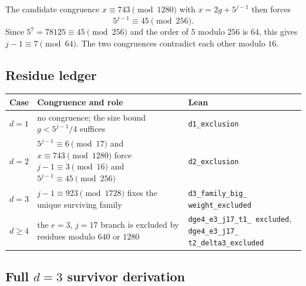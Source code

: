 The candidate congruence $x\equiv743\pmod{1280}$ with
$x=2g+5^{j-1}$ then forces
\begin{equation*}
  5^{j-1}\equiv45\pmod{256}.
\end{equation*}
Since $5^7=78125\equiv45\pmod{256}$ and the order of $5$ modulo $256$
is $64$, this gives $j-1\equiv7\pmod{64}$.  The two congruences
contradict each other modulo $16$.

\subsection{Residue ledger}

\begin{center}
\small
\begin{tabular}{@{}p{}p{}p{}@{}}
\toprule
Case & Congruence and role & Lean \\
\midrule
$d=1$ & no congruence; the size bound $g<5^{j-1}/4$ suffices &
  \texttt{d1\_\allowbreak exclusion} \\
$d=2$ & $5^{j-1}\equiv6\pmod{17}$ and $x\equiv743\pmod{1280}$ force
  $j-1\equiv3\pmod{16}$ and $5^{j-1}\equiv45\pmod{256}$ &
  \texttt{d2\_\allowbreak exclusion} \\
$d=3$ & $j-1\equiv923\pmod{1728}$ fixes the unique surviving family &
  \texttt{d3\_\allowbreak family\_\allowbreak big\_\allowbreak
  weight\_\allowbreak excluded} \\
$d\ge4$ & the $e=3$, $j=17$ branch is excluded by residues modulo
  $640$ or $1280$ &
  \texttt{dge4\_\allowbreak e3\_\allowbreak j17\_\allowbreak t1\_\allowbreak
  excluded}, \texttt{dge4\_\allowbreak e3\_\allowbreak j17\_\allowbreak
  t2\_\allowbreak delta3\_\allowbreak excluded} \\
\bottomrule
\end{tabular}
\end{center}

\subsection{Full $d=3$ survivor derivation}

